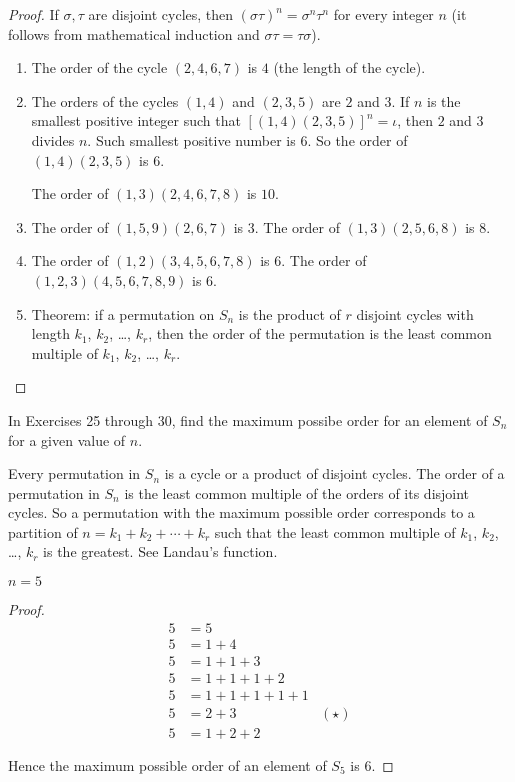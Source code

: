 \begin{proof}
    If $\sigma, \tau$ are disjoint cycles, then ${(\sigma\tau)}^{n} = \sigma^{n}\tau^{n}$ for every integer $n$ (it follows from mathematical induction and $\sigma\tau = \tau\sigma$).

    \begin{enumerate}[label={\textbf{\alph*.}}]
        \item The order of the cycle $(2, 4, 6, 7)$ is $4$ (the length of the cycle).
        \item The orders of the cycles $(1, 4)$ and $(2, 3, 5)$ are $2$ and $3$. If $n$ is the smallest positive integer such that ${[(1, 4)(2, 3, 5)]}^{n} = \iota$, then $2$ and $3$ divides $n$. Such smallest positive number is $6$. So the order of $(1, 4)(2, 3, 5)$ is $6$.

              The order of $(1, 3)(2, 4, 6, 7, 8)$ is $10$.
        \item The order of $(1, 5, 9)(2, 6, 7)$ is $3$. The order of $(1, 3)(2, 5, 6, 8)$ is $8$.
        \item The order of $(1, 2)(3, 4, 5, 6, 7, 8)$ is $6$. The order of $(1, 2, 3)(4, 5, 6, 7, 8, 9)$ is $6$.
        \item Theorem: if a permutation on $S_{n}$ is the product of $r$ disjoint cycles with length $k_{1}$, $k_{2}$, \ldots, $k_{r}$, then the order of the permutation is the least common multiple of $k_{1}$, $k_{2}$, \ldots, $k_{r}$.\qedhere
    \end{enumerate}
\end{proof}

In Exercises 25 through 30, find the maximum possibe order for an element of $S_{n}$ for a given value of $n$.

Every permutation in $S_{n}$ is a cycle or a product of disjoint cycles. The order of a permutation in $S_{n}$ is the least common multiple of the orders of its disjoint cycles. So a permutation with the maximum possible order corresponds to a partition of $n = k_{1} + k_{2} + \cdots + k_{r}$ such that the least common multiple of $k_{1}$, $k_{2}$, \ldots, $k_{r}$ is the greatest. See Landau's function.

\newpage
\begin{exercise}
    $n = 5$
\end{exercise}

\begin{proof}
    \begin{align*}
        5 & = 5                           \\
        5 & = 1 + 4                       \\
        5 & = 1 + 1 + 3                   \\
        5 & = 1 + 1 + 1 + 2               \\
        5 & = 1 + 1 + 1 + 1 + 1           \\
        5 & = 2 + 3             & (\star) \\
        5 & = 1+ 2 + 2
    \end{align*}

    Hence the maximum possible order of an element of $S_{5}$ is $6$.
\end{proof}

